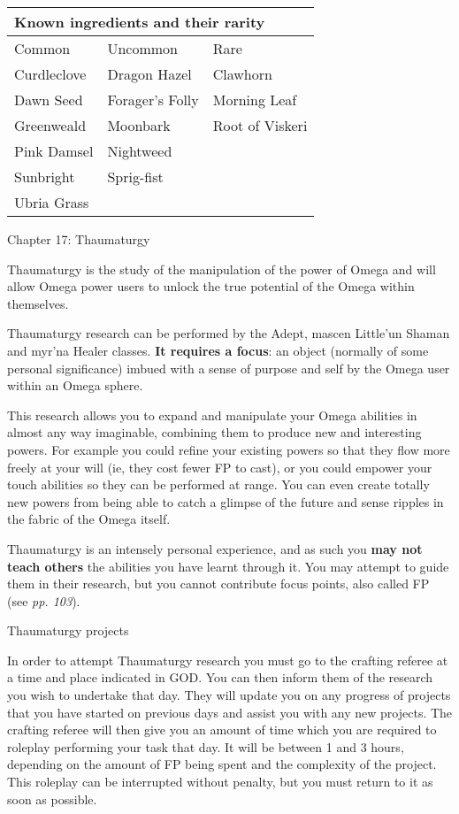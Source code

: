 \documentclass{scrbook}
\begin{document}
\begin{table}
\begin{tabular}{|l|l|l|} \hline 
\multicolumn{3}{|l|}{Known ingredients and their rarity} \\
 \hline Common & Uncommon & Rare \\
 \hline Curdleclove & Dragon Hazel & Clawhorn \\
 \hline Dawn Seed & Forager's Folly & Morning Leaf \\
 \hline Greenweald & Moonbark & Root of Viskeri \\
 \hline Pink Damsel & Nightweed &  \\
 \hline Sunbright & Sprig-fist &  \\
 \hline Ubria Grass &  &  \\
 \hline \end{tabular}

\end{table}

Chapter 17: Thaumaturgy

Thaumaturgy is the study of the manipulation of the power of Omega and will allow Omega power users to unlock the true potential of the Omega within themselves.

Thaumaturgy research can be performed by the Adept, mascen Little'un Shaman and myr'na Healer classes. \textbf{It requires a focus}: an object (normally of some personal significance) imbued with a sense of purpose and self by the Omega user within an Omega sphere.

This research allows you to expand and manipulate your Omega abilities in almost any way imaginable, combining them to produce new and interesting powers. For example you could refine your existing powers so that they flow more freely at your will (ie, they cost fewer FP to cast), or you could empower your touch abilities so they can be performed at range. You can even create totally new powers from being able to catch a glimpse of the future and sense ripples in the fabric of the Omega itself.

Thaumaturgy is an intensely personal experience, and as such you \textbf{may not teach others} the abilities you have learnt through it. You may attempt to guide them in their research, but you cannot contribute focus points, also called FP (see \textit{pp. 103}).

Thaumaturgy projects

In order to attempt Thaumaturgy research you must go to the crafting referee at a time and place indicated in GOD. You can then inform them of the research you wish to undertake that day. They will update you on any progress of projects that you have started on previous days and assist you with any new projects. The crafting referee will then give you an amount of time which you are required to roleplay performing your task that day. It will be between 1 and 3 hours, depending on the amount of FP being spent and the complexity of the project. This roleplay can be interrupted without penalty, but you must return to it as soon as possible.
\end{document}
